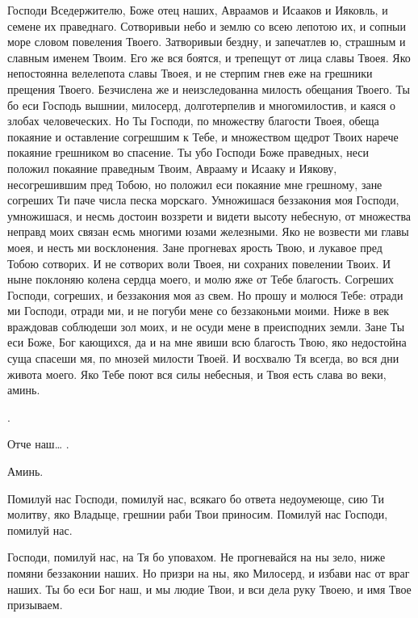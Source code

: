 \begin{mymulticols}
 Господи Вседержителю, Боже отец наших, Авраамов и Исааков и Ияковль, и семене их праведнаго. Сотворивыи небо и землю со всею лепотою их, и сопныи море словом повеления Твоего. Затворивыи бездну, и запечатлев ю, страшным и славным именем Твоим. Его же вся боятся, и трепещут от лица славы Твоея. Яко непостоянна велелепота славы Твоея, и не стерпим гнев еже на грешники прещения Твоего. Безчислена же и неизследованна милость обещания Твоего. Ты бо еси Господь вышнии, милосерд, долготерпелив и многомилостив, и каяся о злобах человеческих. Но Ты Господи, по множеству благости Твоея, обеща покаяние и оставление согрешшим к Тебе, и множеством щедрот Твоих нарече покаяние грешником во спасение. Ты убо Господи Боже праведных, неси положил покаяние праведным Твоим, Аврааму и Исааку и Иякову, несогрешившим пред Тобою, но положил еси покаяние мне грешному, зане согреших Ти паче числа песка морскаго. Умножишася беззакония моя Господи, умножишася, и несмь достоин воззрети и видети высоту небесную, от множества неправд моих связан есмь многими юзами железными. Яко не возвести ми главы моея, и несть ми восклонения. Зане прогневах ярость Твою, и лукавое пред Тобою сотворих. И не сотворих воли Твоея, ни сохраних повелении Твоих. И ныне поклоняю колена сердца моего, и молю яже от Тебе благость. Согреших Господи, согреших, и беззакония моя аз свем. Но прошу и молюся Тебе: отради ми Господи, отради ми, и не погуби мене со беззаконьми моими. Ниже в век враждовав соблюдеши зол моих, и не осуди мене в преисподних земли. Зане Ты еси Боже, Бог кающихся, да и на мне явиши всю благость Твою, яко недостойна суща спасеши мя, по мнозей милости Твоей. И восхвалю Тя всегда, во вся дни живота моего. Яко Тебе поют вся силы небесныя, и Твоя есть слава во веки, аминь.


 .

 Отче наш… .

Аминь.




Помилуй нас Господи, помилуй нас, всякаго бо ответа недоумеюще, сию Ти молитву, яко Владыце, грешнии раби Твои приносим. Помилуй нас Господи, помилуй нас.

 Господи, помилуй нас, на Тя бо уповахом. Не прогневайся на ны зело, ниже помяни беззаконии наших. Но призри на ны, яко Милосерд, и избави нас от враг наших. Ты бо еси Бог наш, и мы людие Твои, и вси дела руку Твоею, и имя Твое призываем.


\end{mymulticols}
